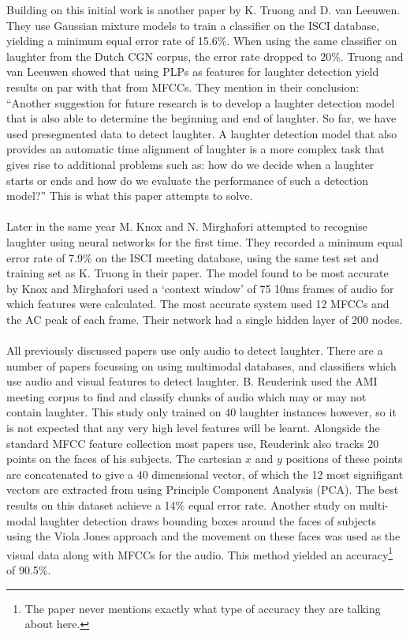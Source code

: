 \documentclass[a4paper,11pt,notitlepage]{article}
\begin{document}
Building on this initial work is another paper by K. Truong and D. van Leeuwen\cite{truong2007automatic}. They use Gaussian mixture models to train a classifier on the ISCI database, yielding a minimum equal error rate of 15.6\%. When using the same classifier on laughter from the Dutch CGN corpus, the error rate dropped to 20\%. Truong and van Leeuwen showed that using PLPs as features for laughter detection yield results on par with that from MFCCs. They mention in their conclusion: ``Another suggestion for future research is to develop a laughter detection model that is also able to determine the beginning and end of laughter. So far, we have used presegmented data to detect laughter. A laughter detection model that also provides an automatic time alignment of laughter is a more complex task that gives rise to additional problems such as: how do we decide when a laughter starts or ends and how do we evaluate the performance of such a detection model?''\cite{truong2007automatic} This is what this paper attempts to solve.\\
\\
Later in the same year M. Knox and N. Mirghafori attempted to recognise laughter using neural networks for the first time\cite{knox2007automatic}. They recorded a minimum equal error rate of 7.9\% on the ISCI meeting database, using the same test set and training set as K. Truong in their paper\cite{truong2007automatic}. The model found to be most accurate by Knox and Mirghafori used a `context window' of 75 10ms frames of audio for which features were calculated. The most accurate system used 12 MFCCs and the AC peak of each frame. Their network had a single hidden layer of 200 nodes.\\
\\
All previously discussed papers use only audio to detect laughter. There are a number of papers focussing on using multimodal databases, and classifiers which use audio and visual features to detect laughter. B. Reuderink\cite{petridis2008fusion,reuderink2008decision} used the AMI meeting corpus to find and classify chunks of audio which may or may not contain laughter. This study only trained on 40 laughter instances however, so it is not expected that any very high level features will be learnt.\cite{petridis2008audiovisual} Alongside the standard MFCC feature collection most papers use, Reuderink also tracks 20 points on the faces of his subjects. The cartesian $x$ and $y$ positions of these points are concatenated to give a 40 dimensional vector, of which the 12 most signifigant vectors are extracted from using Principle Component Analysis (PCA). The best results on this dataset achieve a 14\% equal error rate. Another study on multi-modal laughter detection draws bounding boxes around the faces of subjects using the Viola Jones approach and the movement on these faces was used as the visual data along with MFCCs for the audio.\cite{scherer2009multimodal} This method yielded an accuracy\footnote{The paper never mentions exactly what type of accuracy they are talking about here.} of 90.5\%.\\
\end{document}
